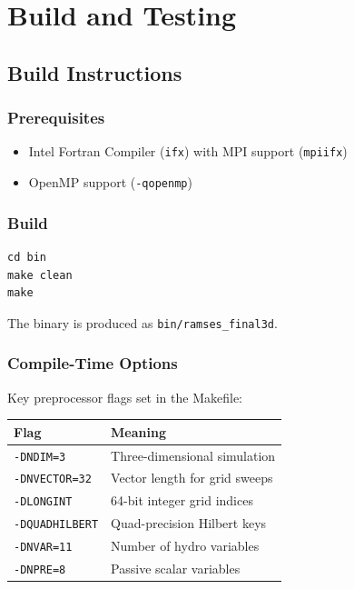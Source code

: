 \documentclass[11pt,fleqn]{book}
\begin{document}
\part{Build and Testing}

\chapter{Build Instructions}
\label{ch:build}

\section{Prerequisites}

\begin{itemize}[leftmargin=2em]
  \item Intel Fortran Compiler (\texttt{ifx}) with MPI support (\texttt{mpiifx})
  \item OpenMP support (\texttt{-qopenmp})
\end{itemize}

\section{Build}

\begin{codebox}
\begin{lstlisting}[style=bash,numbers=none]
cd bin
make clean
make
\end{lstlisting}
\end{codebox}

The binary is produced as \texttt{bin/ramses\_final3d}.

\section{Compile-Time Options}

Key preprocessor flags set in the Makefile:
\begin{center}
\begin{tabular}{ll}
\toprule
\textbf{Flag} & \textbf{Meaning} \\
\midrule
\texttt{-DNDIM=3} & Three-dimensional simulation \\
\texttt{-DNVECTOR=32} & Vector length for grid sweeps \\
\texttt{-DLONGINT} & 64-bit integer grid indices \\
\texttt{-DQUADHILBERT} & Quad-precision Hilbert keys \\
\texttt{-DNVAR=11} & Number of hydro variables \\
\texttt{-DNPRE=8} & Passive scalar variables \\
\bottomrule
\end{tabular}
\end{center}
\end{document}
